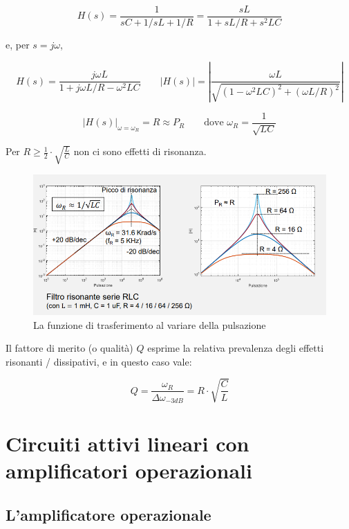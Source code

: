 \documentclass{article}
\begin{document}
\[H(s) = \frac{1}{sC + 1/sL + 1/R} = \frac{sL}{1 + sL/R + s^2 LC}\]

e, per $s = j\omega$, 

\[H(s) = \frac{j \omega L}{1 + j \omega L/R - \omega ^2 LC} \quad \quad |H(s)| = \left| \frac{\omega L}{\sqrt{(1 - \omega ^2 LC)^2 + (\omega L/R)^2}} \right| \]

\[|H(s)|_{\omega = \omega_R} = R \approx P_R \quad \quad \textrm{dove } \omega _R = \frac{1}{\sqrt{LC}}\]

Per $R \geq \frac{1}{2} \cdot \sqrt{\frac{L}{C}}$ non ci sono effetti di risonanza.

\begin{figure}[h]
  \centering
  \includegraphics[scale=0.5]{IM_circuito_risonante_parallelo_RLC_grafici}
  \caption{La funzione di trasferimento al variare della pulsazione}
  \label{Schema_circuito_risonante_parallelo_RLC_grafici}
\end{figure}

Il fattore di merito (o qualità) $Q$ esprime la relativa prevalenza degli effetti risonanti / dissipativi, e in questo caso vale:

\[Q = \frac{\omega _R}{\Delta \omega _{-3dB}} = R \cdot \sqrt{\frac{C}{L}}\]


\clearpage










\section{Circuiti attivi lineari con amplificatori operazionali}

\subsection{L’amplificatore operazionale}
\end{document}
